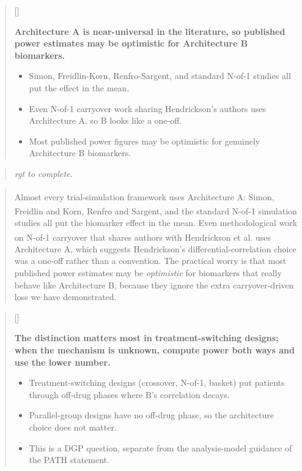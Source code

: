 \documentclass[
  11pt,
]{article}
\newcounter{pgraph}
\newenvironment{bullets}{%
  \stepcounter{pgraph}%
  \begin{quote}\small\sffamily\color[gray]{0.30}%
  {\normalfont\scriptsize\color[gray]{0.58}[\thepgraph]\enspace}}{%
  \end{quote}}
\newenvironment{rgt}{%
  \begin{quote}\small\itshape\color[RGB]{20,60,160}}{%
  \end{quote}}
\newenvironment{orig}{%
  \begin{quote}\normalsize\color[gray]{0.55}}{%
  \end{quote}}
\begin{document}
\begin{bullets}

\textbf{Architecture A is near-universal in the literature, so
published power estimates may be optimistic for Architecture B
biomarkers.}

\begin{itemize}\setlength{\itemsep}{2pt}\setlength{\parskip}{0pt}
\item Simon, Freidlin-Korn, Renfro-Sargent, and standard N-of-1
studies all put the effect in the mean.
\item Even N-of-1 carryover work sharing Hendrickson's authors uses
Architecture A, so B looks like a one-off.
\item Most published power figures may be optimistic for genuinely
Architecture B biomarkers.
\end{itemize}

\end{bullets}

\begin{rgt}
rgt to complete.

\end{rgt}

\begin{orig}
Almost every trial-simulation framework uses Architecture A:
Simon\textsuperscript{}, Freidlin and
Korn\textsuperscript{}, Renfro and
Sargent\textsuperscript{}, and the standard
N-of-1 simulation studies all put the biomarker effect in the mean. Even
methodological work on N-of-1 carryover that shares authors with
Hendrickson et al.\textsuperscript{}
uses Architecture A, which suggests Hendrickson's
differential-correlation choice was a one-off rather than a convention.
The practical worry is that most published power estimates may be
\emph{optimistic} for biomarkers that really behave like Architecture B,
because they ignore the extra carryover-driven loss we have
demonstrated.

\end{orig}

\begin{bullets}

\textbf{The distinction matters most in treatment-switching designs;
when the mechanism is unknown, compute power both ways and use the
lower number.}

\begin{itemize}\setlength{\itemsep}{2pt}\setlength{\parskip}{0pt}
\item Treatment-switching designs (crossover, N-of-1, basket) put
patients through off-drug phases where B's correlation decays.
\item Parallel-group designs have no off-drug phase, so the
architecture choice does not matter.
\item This is a DGP question, separate from the analysis-model
guidance of the PATH statement.
\end{itemize}

\end{bullets}
\end{document}
